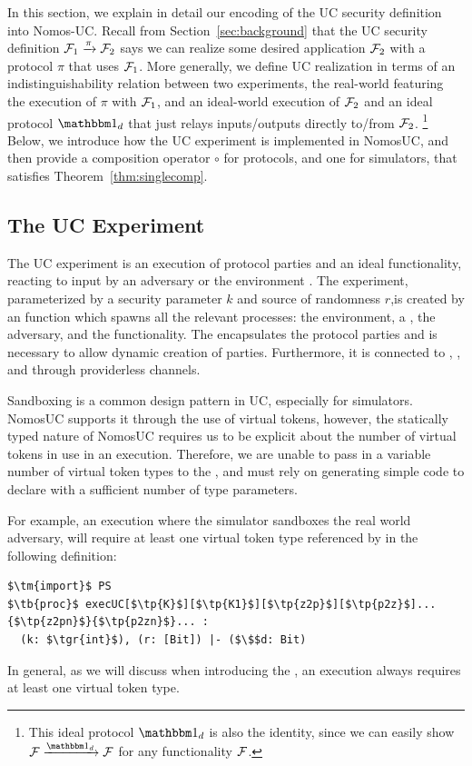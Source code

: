 In this section, we explain in detail our encoding of the UC security definition into Nomos-UC.
Recall from Section~\ref{sec:background} that the UC security definition $\mathcal{F}_1 \xrightarrow{\pi} \mathcal{F}_2$ says we can realize some desired application $\mathcal{F}_2$ with a protocol $\pi$ that uses $\mathcal{F}_1$.
More generally, we define UC realization in terms of an indistinguishability relation between two experiments, the real-world featuring the execution of $\pi$ with $\mathcal{F}_1$, and an ideal-world execution of $\mathcal{F}_2$ and an ideal protocol $\idealP$ that just relays inputs/outputs directly to/from $\mathcal{F}_2$.%
\footnote{This ideal protocol $\idealP$ is also the identity, since we can easily show $\F \xrightarrow{\idealP} \F$ for any functionality $\mathcal{F}$.}
Below, we introduce how the UC experiment is implemented in NomosUC, and then provide a composition operator $\circ$ for protocols, and one for simulators, that satisfies Theorem~\ref{thm:singlecomp}.

\subsection{The UC Experiment}
The UC experiment is an execution of protocol parties and an ideal functionality, reacting to input by an adversary \A or the environment \Z.
The experiment, parameterized by a security parameter $k$ and source of randomness $r$,is created by an  function  which spawns all the relevant processes: the environment, a \partywrapper, the adversary, and the functionality.
The \partywrapper encapsulates the protocol parties and is necessary to allow dynamic creation of parties. 
Furthermore, it is connected to \Z, \A, and \F through providerless channels.

Sandboxing is a common design pattern in UC, especially for simulators.
NomosUC supports it through the use of virtual tokens, however, the statically typed nature of NomosUC requires us to be explicit about the number of virtual tokens in use in an execution.
Therefore, we are unable to pass in a variable number of virtual token types to the , and must rely on generating simple code to declare  with a sufficient number of type parameters.

For example, an execution where the simulator sandboxes the real world adversary,  will require at least one virtual token type referenced by  in the following definition:
\begin{lstlisting}[basicstyle=\scriptsize\BeraMonottFamily, frame=single, mathescape, caption={The process definition of the \msf{execUC} function.}]
$\tm{import}$ PS 
$\tb{proc}$ execUC[$\tp{K}$][$\tp{K1}$][$\tp{z2p}$][$\tp{p2z}$]...{$\tp{z2pn}$}{$\tp{p2zn}$}... :
  (k: $\tgr{int}$), (r: [Bit]) |- ($\$$d: Bit)
\end{lstlisting}
In general, as we will discuss when introducing the \partywrapper, an execution always requires at least one virtual token type.

